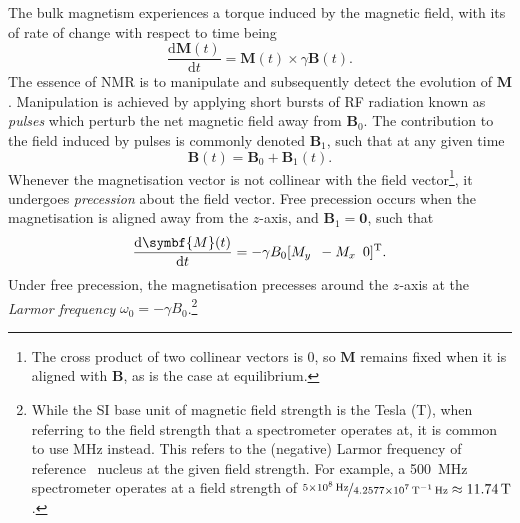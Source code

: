 The bulk magnetism experiences a torque induced by the magnetic field, with its
of rate of change with respect to time being
\begin{equation}
  \frac{\mathrm{d}\symbf{M}(t)}{\mathrm{d}t} = \symbf{M}(t) \times \gamma \symbf{B}(t).
  \label{eq:M-cross-B}
\end{equation}
The essence of \ac{NMR} is to manipulate and subsequently detect the evolution
of $\symbf{M}$. Manipulation is achieved by applying short bursts of \ac{RF}
radiation known as \emph{pulses} which perturb the net magnetic field away from
$\symbf{B}_0$. The contribution to the field induced by pulses is commonly
denoted $\symbf{B}_1$, such that at any given time
\begin{equation}
    \symbf{B}(t) = \symbf{B}_0 + \symbf{B}_1(t).
\end{equation}
Whenever the magnetisation vector is not collinear with the field vector\footnote{
    The cross product of two collinear vectors is $0$, so $\symbf{M}$ remains
    fixed when it is aligned with $\symbf{B}$, as is the case at equilibrium.
}, it
undergoes \emph{precession} about the field vector. Free precession occurs
when the magnetisation is aligned away from the $z$-axis, and $\symbf{B}_1 =
\symbf{0}$, such that
\begin{equation}
  \frac{\mathrm{d}\symbf{M}(t)}{\mathrm{d}t} =
  -\gamma B_0 [M_y \hspace*{5pt} -M_x \hspace{5pt} 0]\T.
\end{equation}
Under free precession, the magnetisation precesses around the $z$-axis at the
\emph{Larmor frequency} $\omega_0 = -\gamma B_0$.\footnote{
    While the SI base unit of magnetic field strength is the Tesla
    (\unit{\tesla}), when referring to the field strength that a spectrometer
    operates at, it is common to use \unit{\mega\hertz} instead. This refers to
    the (negative) Larmor frequency of reference \proton\ nucleus at the
    given field strength. For example, a \qty{500}{\mega\hertz} spectrometer
    operates at a field strength of
    $\nicefrac{\qty{5e8}{\hertz}}{\qty{4.2577e7}{\per\tesla\hertz}}
    \approx \qty{11.74}{\tesla}$.
}

